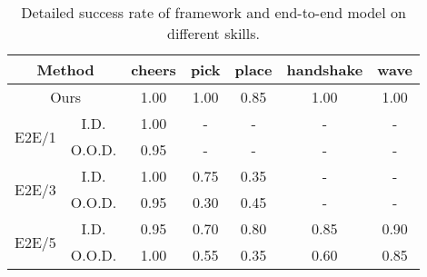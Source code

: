 
\begin{table}[htb]
    \begin{center}
        \caption{Detailed success rate of \our framework and end-to-end model on different skills.}
        \label{tab:framework_detailed}
        \begin{tabular}{cc|ccccc}
            \toprule
            \multicolumn{2}{c|}{\textbf{Method}} & \textbf{cheers} & \textbf{pick} & \textbf{place} & \textbf{handshake} & \textbf{wave} \\
            \midrule
\multicolumn{2}{c|}{Ours} & 1.00 & 1.00 & 0.85 & 1.00 & 1.00 \\
            \midrule
\multirow{2}{*}{E2E/1} & I.D. & 1.00 & -  & -  & -  & -  \\ & O.O.D.  & 0.95 & -  & -  & -  & -  \\
            \midrule
\multirow{2}{*}{E2E/3} & I.D. & 1.00 & 0.75 & 0.35 & -  & -  \\ & O.O.D.  & 0.95 & 0.30 & 0.45 & -  & -  \\
            \midrule
\multirow{2}{*}{E2E/5} & I.D. & 0.95 & 0.70 & 0.80 & 0.85 & 0.90 \\ & O.O.D.  & 1.00 & 0.55 & 0.35 & 0.60 & 0.85 \\
            \bottomrule
        \end{tabular}
    \end{center}
\end{table}